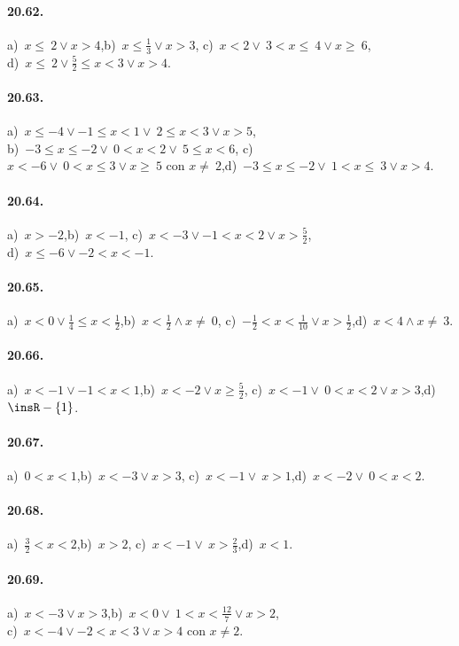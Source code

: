 \paragraph{20.62.} a)~$x\le~2\vee x>4$,\quad b)~$x\le \frac{1}{3}\vee x>3$,\quad
c)~$x<2\vee~3<x\le~4\vee x\ge~6$,\quad \protect\\ d)~$x\le~2\vee \frac{5}{2}\le x<3\vee x>4$.

\paragraph{20.63.} a)~$x\le -4\vee -1\le x<1\vee~2\le x<3\vee x>5$,\quad
\protect\\ b)~$-3\le x\le -2\vee~0<x<2\vee~5\le x<6$,\quad
c)~$x<-6\vee~0<x\le3\vee x\ge~5\text{ con }x\neq~2$,\quad d)~$-3\le x\le -2\vee~1<x\le~3\vee x>4$.

\paragraph{20.64.} a)~$x>-2$,\quad b)~$x<-1$,\quad
c)~$x<-3\vee -1<x<2\vee x>\frac{5}{2}$,\quad
\protect\\ d)~$x\le -6\vee -2<x<-1$.

\paragraph{20.65.} a)~$x<0\vee\frac{1}{4}\le x<\frac{1}{2}$,\quad b)~$x<\frac{1}{2}\wedge x\neq~0$,\quad
c)~$-\frac{1}{2}<x<\frac{1}{10}\vee x>\frac{1}{2}$,\quad d)~$x<4\wedge x\neq~3$.

\paragraph{20.66.} a)~$x<-1\vee -1<x<1$,\quad b)~$x<-2\vee x\ge \frac{5}{2}$,\quad
c)~$x<-1\vee~0<x<2\vee x>3$,\quad d)~$\insR-\{1\}$.

\paragraph{20.67.} a)~$0<x<1$,\quad b)~$x<-3\vee x>3$,\quad
c)~$x<-1\vee~x>1$,\quad d)~$x<-2 \vee~0<x<2$.

\paragraph{20.68.} a)~$\frac{3}{2}<x<2$,\quad b)~$x>2$,\quad
c)~$x<-1\vee~x>\frac{2}{3}$,\quad d)~$x<1$.

\paragraph{20.69.} a)~$x<-3\vee x>3$,\quad b)~$x<0\vee~1<x<\frac{12}{7}\vee x>2$,\quad
\protect\\ c)~$x<-4\vee -2<x<3\vee x>4\text{ con }x\neq2$.

